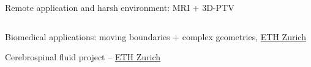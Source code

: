 \begin{frame}[label=app-13]{Remote application and harsh environment: MRI + 3D-PTV}
    \begin{columns}
        \centering{}
    \end{columns}
\end{frame}

\begin{frame}[label=app-14]{Biomedical applications: moving boundaries + complex geometries, \href{https://www.dropbox.com/s/p1xnc7mefoqboti/aorta_rigid.mp4?dl=0}{ETH Zurich}}
\end{frame}

\begin{frame}[label=app-15]{Cerebrospinal fluid project -- \href{https://idsc.ethz.ch/research-guzzella-onder/research-projects/ProjectArchive/csf-biothermofluidics.html}{ETH Zurich}}
\end{frame}
    
    
